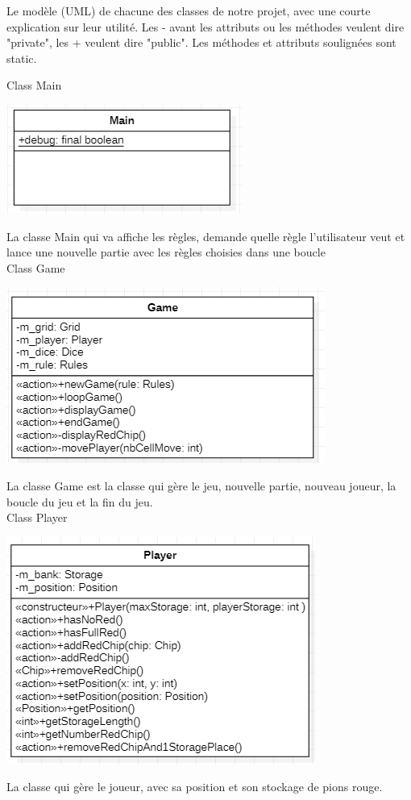Le modèle (UML) de chacune des classes de notre projet, avec une courte explication sur leur utilité.
Les - avant les attributs ou les méthodes veulent dire "private",
les + veulent dire "public".
Les méthodes et attributs soulignées sont static. 


Class Main
\begin{center}
\includegraphics{Main.png}
\end{center}
La classe Main qui va affiche les règles, demande quelle règle l'utilisateur veut et lance une nouvelle partie avec les règles choisies dans une boucle \\

Class Game
\begin{center}
\includegraphics{Game.png}
\end{center}
La classe Game est la classe qui gère le jeu, nouvelle partie, nouveau joueur, la boucle du jeu et la fin du jeu.\\


Class Player
\begin{center}
\includegraphics{Player.png}
\end{center}
La classe qui gère le joueur, avec sa position et son stockage de pions rouge. \\

